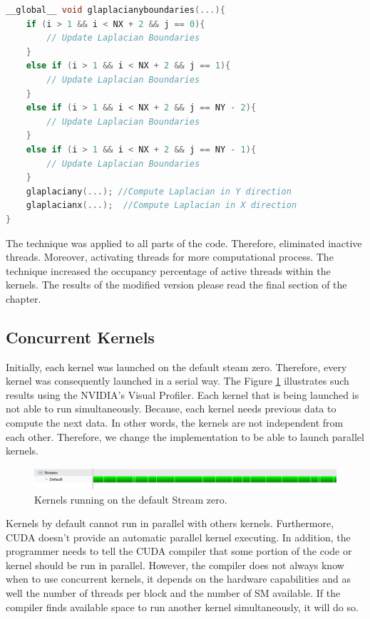\begin{lstlisting}[language=C++, label={lst:newcde}, caption={More workload on a single kernel execution}]
__global__ void glaplacianyboundaries(...){
    if (i > 1 && i < NX + 2 && j == 0){
     	// Update Laplacian Boundaries
    }
    else if (i > 1 && i < NX + 2 && j == 1){
  		// Update Laplacian Boundaries
    }
    else if (i > 1 && i < NX + 2 && j == NY - 2){
        // Update Laplacian Boundaries
    }
    else if (i > 1 && i < NX + 2 && j == NY - 1){
        // Update Laplacian Boundaries
    }
    glaplaciany(...); //Compute Laplacian in Y direction
	glaplacianx(...);  //Compute Laplacian in X direction
}
\end{lstlisting}

The technique was applied to all parts of the code. Therefore, eliminated inactive threads. Moreover, activating threads for more computational process. The technique increased the occupancy percentage of active threads within the kernels. The results of the modified version please read the final section of the chapter.

\subsection{Concurrent Kernels}

Initially, each kernel was launched on the default steam zero. Therefore, every kernel was consequently launched in a serial way. The Figure \ref{fig:streams} illustrates such results using the NVIDIA's Visual Profiler. Each kernel that is being launched is not able to run simultaneously. Because, each kernel needs previous data to compute the next data. In other words, the kernels are not independent from each other. Therefore, we change the implementation to be able to launch parallel kernels.

\begin{figure}[htbp]
	\centering
		\includegraphics[width=1.0\textwidth]{Figures/ini_steams.png}
		\smallskip
	\caption[Initial Streams]{Kernels running on the default Stream zero.
}
	\label{fig:streams}
\end{figure}

 Kernels by default cannot run in parallel with others kernels. Furthermore, CUDA doesn't provide an automatic parallel kernel executing. In addition, the programmer needs to tell the CUDA compiler that some portion of the code or kernel should be run in parallel. However, the compiler does not always know when to use concurrent kernels, it depends on the hardware capabilities and as well the number of threads per block and the number of SM available. If the compiler finds available space to run another kernel simultaneously, it will do so. 

